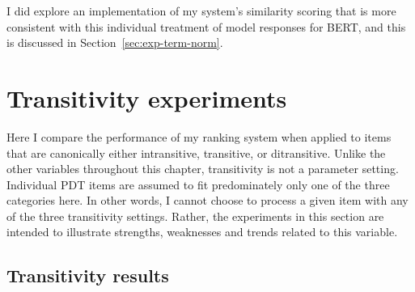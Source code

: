 I did explore an implementation of my system's similarity scoring that is more consistent with this individual treatment of model responses for BERT, and this is discussed in Section~\ref{sec:exp-term-norm}.

\label{sec:bert-results}

\section{Transitivity experiments}
\label{sec:exp-transitivity}
Here I compare the performance of my ranking system when applied to items that are canonically either intransitive, transitive, or ditransitive. Unlike the other variables throughout this chapter, transitivity is not a parameter setting. Individual PDT items are assumed to fit predominately only one of the three categories here. In other words, I cannot choose to process a given item with any of the three transitivity settings. Rather, the experiments in this section are intended to illustrate strengths, weaknesses and trends related to this variable.

\subsection{Transitivity results}
\label{sec:transitivity-results}

